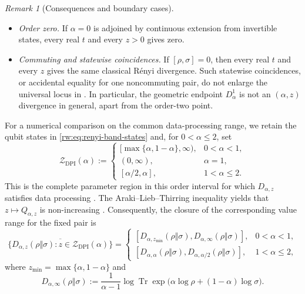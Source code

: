 \documentclass[11pt]{article}
\theoremstyle{remark}
\newtheorem{remark}[remark]{Remark}
\newcommand{\1}{\mathbbm{1}}
\begin{document}
\begin{remark}[Consequences and boundary cases]
\begin{itemize}[leftmargin=1.5em,itemsep=2pt,parsep=0pt,topsep=4pt]
 \item \emph{Order zero.}
 If $\alpha=0$ is adjoined by continuous extension from invertible states,
 every real $t$ and every $z>0$ gives zero.

 \item \emph{Commuting and statewise coincidences.}
 If $[\rho,\sigma]=0$, then every real $t$ and every $z$ gives the
 same classical R\'enyi divergence.  Such statewise coincidences, or
 accidental equality for one noncommuting pair, do not enlarge the
 universal locus in .  In
 particular, the geometric endpoint $D_\alpha^1$ is not an
 $(\alpha,z)$ divergence in general, apart from the order-two point.
\end{itemize}
\end{remark}

For a numerical comparison on the common data-processing range, we retain
the qubit states in \eqref{rw:eq:renyi-band-states} and, for
$0<\alpha\leq2$, set
\begin{equation}
 \mathcal Z_{\mathrm{DPI}}(\alpha)
 :=\begin{cases}
 [\max\{\alpha,1-\alpha\},\infty),&0<\alpha<1,\\[1mm]
 (0,\infty),&\alpha=1,\\[1mm]
 [\alpha/2,\alpha],&1<\alpha\leq2.
 \end{cases}
 \label{rw:eq:alpha-z-dpi-region}
\end{equation}
This is the complete parameter region in this order interval for which
$D_{\alpha,z}$ satisfies data processing
\cite[Theorem~1.1]{zhang2020alphazdpi}.  The Araki--Lieb--Thirring
inequality \cite{araki1990lieb} yields that
$z\mapsto Q_{\alpha,z}$ is non-increasing
\cite[Proposition~6]{lin2015investigating}.
Consequently, the closure of the corresponding value range for the
fixed pair is
\begin{equation}
 \overline{\bigl\{D_{\alpha,z}(\rho\Vert\sigma):
       z\in\mathcal Z_{\mathrm{DPI}}(\alpha)\bigr\}}
 =\begin{cases}
 [D_{\alpha,z_{\min}}(\rho\Vert\sigma),
  D_{\alpha,\infty}(\rho\Vert\sigma)],&0<\alpha<1,\\[1mm]
 [D_{\alpha,\alpha}(\rho\Vert\sigma),
  D_{\alpha,\alpha/2}(\rho\Vert\sigma)],&1<\alpha\leq2,
 \end{cases}
 \label{rw:eq:alpha-z-dpi-value-band}
\end{equation}
where $z_{\min}=\max\{\alpha,1-\alpha\}$ and
\begin{equation}
 D_{\alpha,\infty}(\rho\Vert\sigma)
 :=\frac{1}{\alpha-1}\log\operatorname{Tr}
 \exp\!\bigl(\alpha\log\rho+(1-\alpha)\log\sigma\bigr).
 \label{rw:eq:alpha-z-log-euclidean-limit}
\end{equation}
\end{document}

